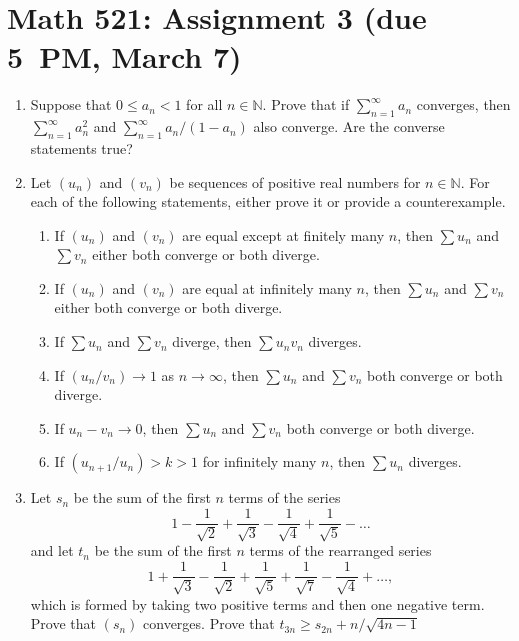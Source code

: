 \documentclass[12pt]{article}
\newcommand{\N}{\mathbb{N}}
\begin{document}
\section*{Math 521: Assignment 3 (due 5~PM, March 7)}
\begin{enumerate}
  \item Suppose that $0 \le a_n < 1$ for all $n\in \N$. Prove that if
    $\sum_{n=1}^\infty a_n$ converges, then $\sum_{n=1}^\infty a_n^2$ and
    $\sum_{n=1}^\infty a_n/(1-a_n)$ also converge. Are the converse statements
    true?
  \item Let $(u_n)$ and $(v_n)$ be sequences of positive real numbers for $n\in
    \N$. For each of the following statements, either prove it or provide a
    counterexample.
    \begin{enumerate}
        \item If $(u_n)$ and $(v_n)$ are equal except at finitely many $n$, then
      $\sum u_n$ and $\sum v_n$ either both converge or both diverge.
        \item If $(u_n)$ and $(v_n)$ are equal at infinitely many $n$, then $\sum
      u_n$ and $\sum v_n$ either both converge or both diverge.
        \item If $\sum u_n$ and $\sum v_n$ diverge, then $\sum u_n v_n$ diverges.
        \item If $(u_n/v_n) \to 1$ as $n \to \infty$, then $\sum u_n$ and $\sum
      v_n$ both converge or both diverge.
        \item If $u_n-v_n\to 0$, then $\sum u_n$ and $\sum v_n$ both converge
      or both diverge.
        \item If $(u_{n+1}/u_n)>k>1$ for infinitely many $n$, then $\sum u_n$
      diverges.
    \end{enumerate}
  \item Let $s_n$ be the sum of the first $n$ terms of the series
    \begin{equation}
      1 - \frac{1}{\sqrt{2}} + \frac{1}{\sqrt{3}} - \frac{1}{\sqrt{4}} + \frac{1}{\sqrt{5}} - \ldots
    \end{equation}
    and let $t_n$ be the sum of the first $n$ terms of the rearranged series
    \begin{equation}
      1 + \frac{1}{\sqrt{3}} - \frac{1}{\sqrt{2}} + \frac{1}{\sqrt{5}} + \frac{1}{\sqrt{7}} - \frac{1}{\sqrt{4}} + \ldots,
    \end{equation}
    which is formed by taking two positive terms and then one negative term.
    Prove that $(s_n)$ converges. Prove that $t_{3n} \ge s_{2n} + n/\sqrt{4n-1}$

\end{enumerate}
\end{document}
